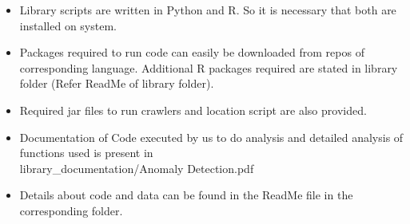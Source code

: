 \documentclass[a4paper,10pt]{article}
\begin{document}
\begin{itemize}
	\item Library scripts are written in Python and R. So it is necessary that both are installed on system. 
	\item Packages required to run code can easily be downloaded from repos of corresponding language. Additional R packages required are stated in library folder (Refer ReadMe of library folder).
	\item Required jar files to run crawlers and location script are also provided.
	\item Documentation of Code executed by us to do analysis and detailed analysis of functions used is present in \\
			library\_documentation/Anomaly Detection.pdf
	\item Details about code and data can be found in the ReadMe file in the corresponding folder.
\end{itemize}
\end{document}
